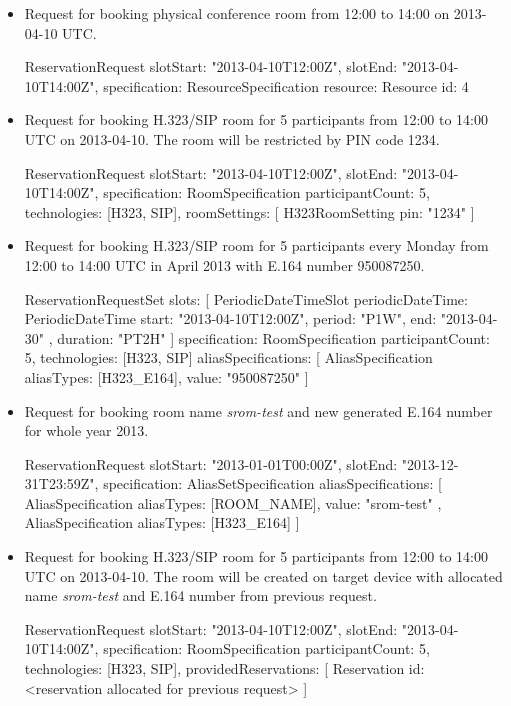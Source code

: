 \begin{itemize}

\item Request for booking physical conference room from 12:00 to 14:00 on 2013-04-10 UTC.
\begin{Entity}
ReservationRequest {
  slotStart: "2013-04-10T12:00Z",
  slotEnd:   "2013-04-10T14:00Z",
  specification: ResourceSpecification {
    resource: Resource { id: 4 }
  }
}
\end{Entity}

\item Request for booking H.323/SIP room for 5 participants from 12:00 to 14:00 UTC on 2013-04-10. The room will be restricted by PIN code 1234.
\begin{Entity}
ReservationRequest {
  slotStart: "2013-04-10T12:00Z",
  slotEnd:   "2013-04-10T14:00Z",
  specification: RoomSpecification {
    participantCount: 5,
    technologies: [H323, SIP],
    roomSettings: [
      H323RoomSetting { pin: "1234" }
    ]
  }
}
\end{Entity}

\newpage
\item Request for booking H.323/SIP room for 5 participants every Monday from 12:00 to 14:00 UTC in April 2013 with E.164 number 950087250.
\begin{Entity}
ReservationRequestSet {
  slots: [
    PeriodicDateTimeSlot {
      periodicDateTime: PeriodicDateTime {
        start:  "2013-04-10T12:00Z",
        period: "P1W",
        end:    "2013-04-30"
      },
      duration: "PT2H"
    }
  ]
  specification: RoomSpecification {
    participantCount: 5,
    technologies: [H323, SIP]
    aliasSpecifications: [
      AliasSpecification { aliasTypes: [H323_E164], value: "950087250" }
    ]
  }
}
\end{Entity}


\item Request for booking room name \textit{srom-test} and new generated E.164 number for whole year 2013.
\begin{Entity}
ReservationRequest {
  slotStart: "2013-01-01T00:00Z",
  slotEnd:   "2013-12-31T23:59Z",
  specification: AliasSetSpecification {
    aliasSpecifications: [
      AliasSpecification {
        aliasTypes: [ROOM_NAME], 
        value: "srom-test"
      },
      AliasSpecification {
        aliasTypes: [H323_E164]
      }
    ]    
  }
}
\end{Entity}

\item Request for booking H.323/SIP room for 5 participants from 12:00 to 14:00 UTC on 2013-04-10. The room will be created on target device with allocated name \textit{srom-test} and E.164 number from previous request.
\begin{Entity}
ReservationRequest {
  slotStart: "2013-04-10T12:00Z",
  slotEnd:   "2013-04-10T14:00Z",
  specification: RoomSpecification {
    participantCount: 5,
    technologies: [H323, SIP],
    providedReservations: [
      Reservation { id: <reservation allocated for previous request> }
    ]
  }
}
\end{Entity}


\end{itemize}
